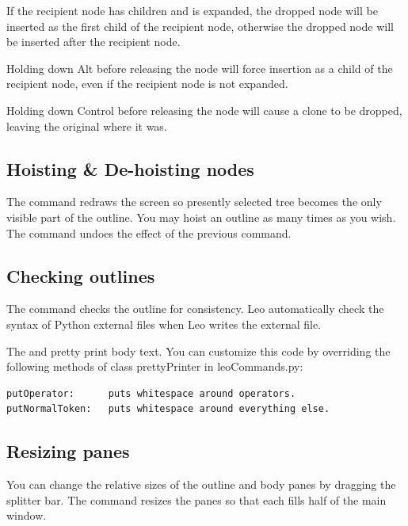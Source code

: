 \documentclass[a4paper,10pt,english]{sphinxmanual}
\begin{document}
If the recipient node has children and is expanded, the dropped node will
be inserted as the first child of the recipient node, otherwise the
dropped node will be inserted after the recipient node.

Holding down Alt before releasing the node will force insertion as a
child of the recipient node, even if the recipient node is not expanded.

Holding down Control before releasing the node will cause a clone to be
dropped, leaving the original where it was.


\subsection{Hoisting \& De-hoisting nodes}
\label{commands:hoisting-de-hoisting-nodes}
The  command redraws the screen so presently selected tree becomes
the only visible part of the outline. You may hoist an outline as many
times as you wish. The  command undoes the effect of the
previous  command.


\subsection{Checking outlines}
\label{commands:checking-outlines}
The  command checks the outline for consistency. Leo
automatically check the syntax of Python external files when Leo
writes the external file.

The  and 
pretty print body text. You can customize this code by overriding the
following methods of class prettyPrinter in leoCommands.py:

\begin{Verbatim}[commandchars=\\\{\}]
putOperator:      puts whitespace around operators.
putNormalToken:   puts whitespace around everything else.
\end{Verbatim}


\subsection{Resizing panes}
\label{commands:resizing-panes}
You can change the relative sizes of the outline and body panes by dragging
the splitter bar. The  command resizes the panes so
that each fills half of the main window.
\end{document}
